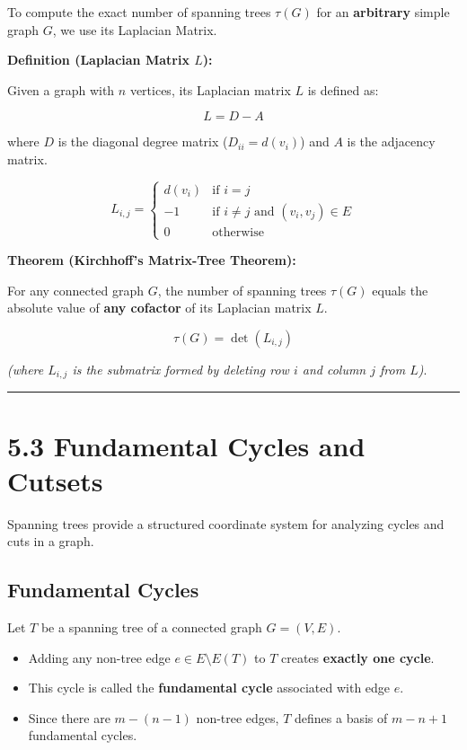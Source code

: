 \documentclass[
]{book}
\providecommand{\tightlist}{%
  \setlength{\itemsep}{0pt}\setlength{\parskip}{0pt}}
\theoremstyle{definition}
\theoremstyle{definition}
\theoremstyle{definition}
\theoremstyle{definition}
\theoremstyle{remark}
\begin{document}
To compute the exact number of spanning trees \(\tau(G)\) for an \textbf{arbitrary} simple graph \(G\), we use its Laplacian Matrix.

\textbf{Definition (Laplacian Matrix \(L\)):}

Given a graph with \(n\) vertices, its Laplacian matrix \(L\) is defined as:

\[L = D - A\]

where \(D\) is the diagonal degree matrix (\(D_{ii} = d(v_i)\)) and \(A\) is the adjacency matrix.

\[L_{i,j} = \begin{cases} d(v_i) & \text{if } i = j \\ -1 & \text{if } i \neq j \text{ and } (v_i, v_j) \in E \\ 0 & \text{otherwise} \end{cases}\]

\textbf{Theorem (Kirchhoff's Matrix-Tree Theorem):}

For any connected graph \(G\), the number of spanning trees \(\tau(G)\) equals the absolute value of \textbf{any cofactor} of its Laplacian matrix \(L\).

\[\tau(G) = \det(L_{i,j})\]

\emph{(where \(L_{i,j}\) is the submatrix formed by deleting row \(i\) and column \(j\) from \(L\))}.

\begin{center}\rule{0.5\linewidth}{0.5pt}\end{center}

\section{5.3 Fundamental Cycles and Cutsets}\label{fundamental-cycles-and-cutsets}

Spanning trees provide a structured coordinate system for analyzing cycles and cuts in a graph.

\subsection{Fundamental Cycles}\label{fundamental-cycles}

Let \(T\) be a spanning tree of a connected graph \(G = (V, E)\).

\begin{itemize}
\tightlist
\item
  Adding any non-tree edge \(e \in E \setminus E(T)\) to \(T\) creates \textbf{exactly one cycle}.
\item
  This cycle is called the \textbf{fundamental cycle} associated with edge \(e\).
\item
  Since there are \(m - (n - 1)\) non-tree edges, \(T\) defines a basis of \(m - n + 1\) fundamental cycles.
\end{itemize}
\end{document}
